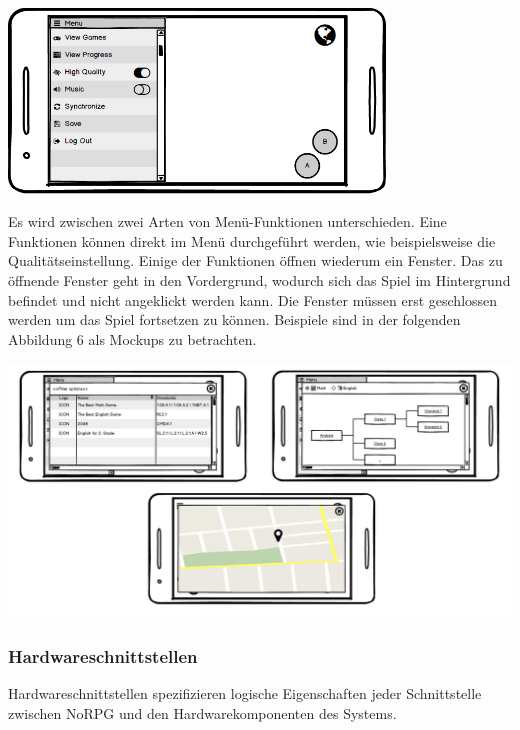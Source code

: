 			\begin{center}
				\includegraphics[width=10cm]{pics/Menu.png}
			\end{center}
			
			Es wird zwischen zwei Arten von Menü-Funktionen unterschieden. Eine Funktionen können direkt im Menü durchgeführt werden, wie beispielsweise die Qualitätseinstellung. Einige der Funktionen öffnen wiederum ein Fenster. Das zu öffnende Fenster geht in den Vordergrund, wodurch sich das Spiel im Hintergrund befindet und nicht angeklickt werden kann. Die Fenster müssen erst geschlossen werden um das Spiel fortsetzen zu können. Beispiele sind in der folgenden Abbildung 6 als Mockups zu betrachten.
			
			\begin{center}
				\includegraphics[width=\textwidth]{pics/NewWindows.png}
			\end{center}
		
		\subsubsection{Hardwareschnittstellen}
			Hardwareschnittstellen spezifizieren logische Eigenschaften jeder Schnittstelle zwischen NoRPG und den Hardwarekomponenten des Systems. 
			
